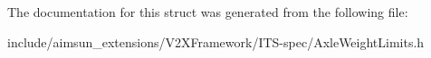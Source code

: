 The documentation for this struct was generated from the following file\+:\begin{DoxyCompactItemize}
\item 
include/aimsun\+\_\+extensions/\+V2\+X\+Framework/\+I\+T\+S-\/spec/Axle\+Weight\+Limits.\+h\end{DoxyCompactItemize}
